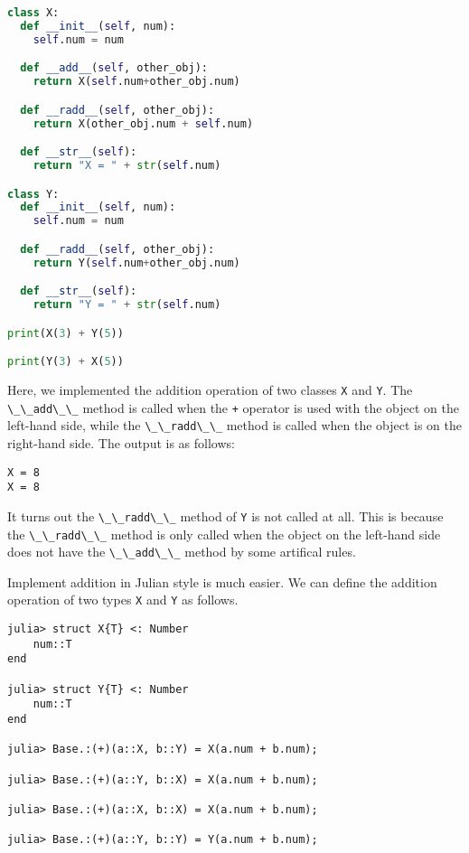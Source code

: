 \documentclass[
  notoc %
]{tufte-book}
\newcommand{\passthrough}[1]{#1}
\begin{document}
\begin{lstlisting}[language=Python]
class X:
  def __init__(self, num):
    self.num = num

  def __add__(self, other_obj):
    return X(self.num+other_obj.num)

  def __radd__(self, other_obj):
    return X(other_obj.num + self.num)

  def __str__(self):
    return "X = " + str(self.num)

class Y:
  def __init__(self, num):
    self.num = num

  def __radd__(self, other_obj):
    return Y(self.num+other_obj.num)

  def __str__(self):
    return "Y = " + str(self.num)

print(X(3) + Y(5))

print(Y(3) + X(5))
\end{lstlisting}

Here, we implemented the addition operation of two classes
\passthrough{\lstinline!X!} and \passthrough{\lstinline!Y!}. The
\passthrough{\lstinline!\_\_add\_\_!} method is called when the
\passthrough{\lstinline!+!} operator is used with the object on the
left-hand side, while the \passthrough{\lstinline!\_\_radd\_\_!} method
is called when the object is on the right-hand side. The output is as
follows:

\begin{lstlisting}
X = 8
X = 8
\end{lstlisting}

It turns out the \passthrough{\lstinline!\_\_radd\_\_!} method of
\passthrough{\lstinline!Y!} is not called at all. This is because the
\passthrough{\lstinline!\_\_radd\_\_!} method is only called when the
object on the left-hand side does not have the
\passthrough{\lstinline!\_\_add\_\_!} method by some artifical rules.

Implement addition in Julian style is much easier. We can define the
addition operation of two types \passthrough{\lstinline!X!} and
\passthrough{\lstinline!Y!} as follows.

\begin{lstlisting}
julia> struct X{T} <: Number
    num::T
end

julia> struct Y{T} <: Number
    num::T
end

julia> Base.:(+)(a::X, b::Y) = X(a.num + b.num);

julia> Base.:(+)(a::Y, b::X) = X(a.num + b.num);

julia> Base.:(+)(a::X, b::X) = X(a.num + b.num);

julia> Base.:(+)(a::Y, b::Y) = Y(a.num + b.num);
\end{lstlisting}
\end{document}
